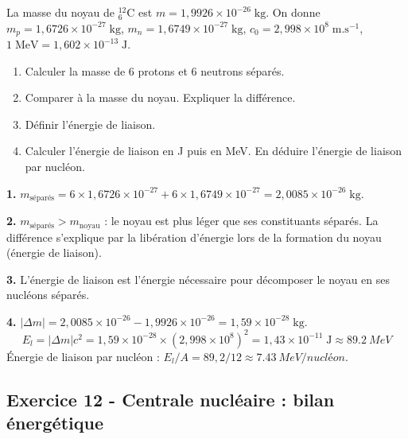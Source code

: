 \documentclass[12pt,a4paper]{article}
\begin{document}
\begin{boiteexercice}
La masse du noyau de ${}_{6}^{12}$C est $m = 1{,}9926\times10^{-26}\;\text{kg}$. On donne $m_p = 1{,}6726\times10^{-27}\;\text{kg}$, $m_n = 1{,}6749\times10^{-27}\;\text{kg}$, $c_0 = 2{,}998\times10^8\;\text{m.s}^{-1}$, $1\;\text{MeV} = 1{,}602\times10^{-13}\;\text{J}$.
\begin{enumerate}
  \item Calculer la masse de 6 protons et 6 neutrons séparés.
  \item Comparer à la masse du noyau. Expliquer la différence.
  \item Définir l'énergie de liaison.
  \item Calculer l'énergie de liaison en J puis en MeV. En déduire l'énergie de liaison par nucléon.
\end{enumerate}
\end{boiteexercice}

\begin{boitecorrige}
\textbf{1.} $m_\text{séparés} = 6\times1{,}6726\times10^{-27} + 6\times1{,}6749\times10^{-27} = 2{,}0085\times10^{-26}\;\text{kg}$.

\textbf{2.} $m_\text{séparés} > m_\text{noyau}$ : le noyau est plus léger que ses constituants séparés. La différence s'explique par la libération d'énergie lors de la formation du noyau (énergie de liaison).

\textbf{3.} L'énergie de liaison est l'énergie nécessaire pour décomposer le noyau en ses nucléons séparés.

\textbf{4.} $|\Delta m| = 2{,}0085\times10^{-26} - 1{,}9926\times10^{-26} = 1{,}59\times10^{-28}\;\text{kg}$.
\[
E_l = |\Delta m|c^2 = 1{,}59\times10^{-28}\times(2{,}998\times10^8)^2 = 1{,}43\times10^{-11}\;\text{J} \approx \qty{89.2}{MeV}
\]
Énergie de liaison par nucléon : $E_l/A = 89{,}2/12 \approx \qty{7.43}{MeV/nucléon}$.
\end{boitecorrige}

\subsection*{Exercice 12 - Centrale nucléaire : bilan énergétique \niveau{\difficile}}
\end{document}
